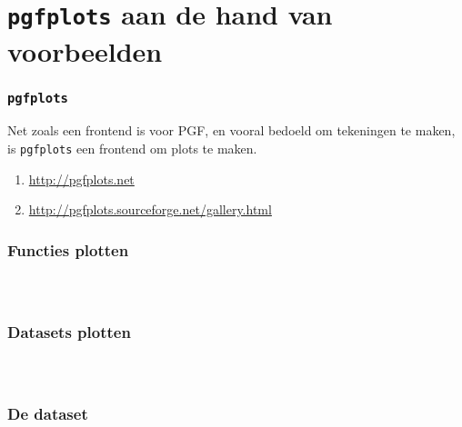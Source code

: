 \section{\texttt{pgfplots} aan de hand van voorbeelden}

\begin{frame}
  \frametitle{\texttt{pgfplots}}

  Net zoals \TikZ een frontend is voor PGF, en vooral bedoeld om tekeningen te maken, is \texttt{pgfplots} een frontend om plots te maken.

  \begin{enumerate}
    \item \url{http://pgfplots.net}
    \item \url{http://pgfplots.sourceforge.net/gallery.html}
  \end{enumerate}
\end{frame}

\begin{frame}
  \frametitle{Functies plotten}

  \begin{columns}
    \begin{column}{.4\textwidth}
      \inputminted[fontsize = \scriptsize]{latex}{tikz/pgfplots/parabola.tikz}
    \end{column}
    \begin{column}{.6\textwidth}
      
    \end{column}
  \end{columns}
\end{frame}

\begin{frame}
  \frametitle{Datasets plotten}

  \begin{columns}
    \begin{column}{.4\textwidth}
      \inputminted[fontsize = \scriptsize]{latex}{tikz/pgfplots/external.tikz}
    \end{column}
    \begin{column}{.6\textwidth}
      
    \end{column}
  \end{columns}
\end{frame}

\begin{frame}
  \frametitle{De dataset}

  \inputminted[lastline = 10]{latex}{tikz/pgfplots/data.dat}
\end{frame}

